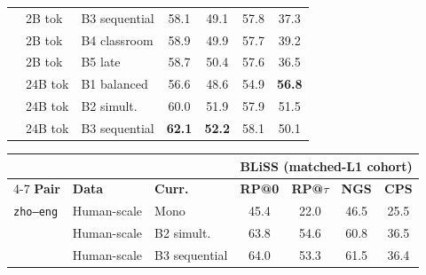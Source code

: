 \documentclass[11pt]{article}
\begin{document}
\begin{table}[!ht]
\begin{minipage}[t]{0.49\linewidth}
\begin{tabular}{ll l cccc}
 & 2B tok & B3 sequential & \cellcolor[rgb]{0.916,1.000,0.916} 58.1 & \cellcolor[rgb]{1.000,0.991,0.991} 49.1 & \cellcolor[rgb]{0.897,1.000,0.897} 57.8 & \cellcolor[rgb]{1.000,0.860,0.860} 37.3 \\
 & 2B tok & B4 classroom & \cellcolor[rgb]{0.907,1.000,0.907} 58.9 & \cellcolor[rgb]{1.000,0.999,0.999} 49.9 & \cellcolor[rgb]{0.898,1.000,0.898} 57.7 & \cellcolor[rgb]{1.000,0.881,0.881} 39.2 \\
 & 2B tok & B5 late & \cellcolor[rgb]{0.909,1.000,0.909} 58.7 & \cellcolor[rgb]{0.995,1.000,0.995} 50.4 & \cellcolor[rgb]{0.899,1.000,0.899} 57.6 & \cellcolor[rgb]{1.000,0.851,0.851} 36.5 \\
\addlinespace[1.5pt]
 & 24B tok & B1 balanced & \cellcolor[rgb]{0.931,1.000,0.931} 56.6 & \cellcolor[rgb]{1.000,0.987,0.987} 48.6 & \cellcolor[rgb]{0.935,1.000,0.935} 54.9 & \cellcolor[rgb]{0.861,1.000,0.861} \textbf{56.8} \\
 & 24B tok & B2 simult. & \cellcolor[rgb]{0.896,1.000,0.896} 60.0 & \cellcolor[rgb]{0.976,1.000,0.976} 51.9 & \cellcolor[rgb]{0.895,1.000,0.895} 57.9 & \cellcolor[rgb]{0.969,1.000,0.969} 51.5 \\
 & 24B tok & B3 sequential & \cellcolor[rgb]{0.874,1.000,0.874} \textbf{62.1} & \cellcolor[rgb]{0.972,1.000,0.972} \textbf{52.2} & \cellcolor[rgb]{0.893,1.000,0.893} 58.1 & \cellcolor[rgb]{0.998,1.000,0.998} 50.1 \\
\bottomrule
\end{tabular}
\end{minipage}\hfill
\begin{minipage}[t]{0.49\linewidth}\centering
\begin{tabular}{ll l cccc}
\toprule
& & & \multicolumn{4}{c}{\textbf{BLiSS (matched-L1 cohort)}} \\
\cmidrule(lr){4-7}
\textbf{Pair} & \textbf{Data} & \textbf{Curr.} & \textbf{RP@0} & \textbf{RP@$\tau$} & \textbf{NGS} & \textbf{CPS} \\
\midrule
\texttt{zho--eng} & Human-scale & Mono & \cellcolor[rgb]{1.000,0.730,0.730} 45.4 & \cellcolor[rgb]{1.000,0.730,0.730} 22.0 & \cellcolor[rgb]{1.000,0.730,0.730} 46.5 & \cellcolor[rgb]{1.000,0.730,0.730} 25.5 \\
 & Human-scale & B2 simult. & \cellcolor[rgb]{0.856,1.000,0.856} 63.8 & \cellcolor[rgb]{0.942,1.000,0.942} 54.6 & \cellcolor[rgb]{0.857,1.000,0.857} 60.8 & \cellcolor[rgb]{1.000,0.851,0.851} 36.5 \\
 & Human-scale & B3 sequential & \cellcolor[rgb]{0.854,1.000,0.854} 64.0 & \cellcolor[rgb]{0.958,1.000,0.958} 53.3 & \cellcolor[rgb]{0.848,1.000,0.848} 61.5 & \cellcolor[rgb]{1.000,0.850,0.850} 36.4 \\

\end{tabular}
\end{minipage}
\end{table}
\end{document}
